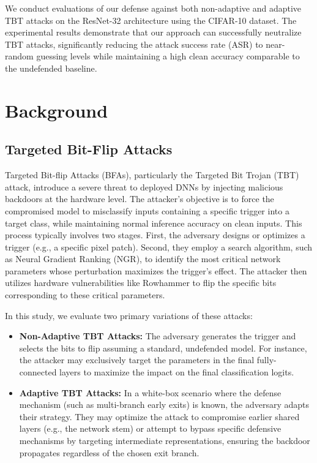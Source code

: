 \documentclass[conference]{IEEEtran}
\begin{document}
We conduct evaluations of our defense against both non-adaptive and adaptive TBT attacks on the ResNet-32 architecture using the CIFAR-10 dataset. The experimental results demonstrate that our approach can successfully neutralize TBT attacks, significantly reducing the attack success rate (ASR) to near-random guessing levels while maintaining a high clean accuracy comparable to the undefended baseline.

\section{Background}

\subsection{Targeted Bit-Flip Attacks}
Targeted Bit-flip Attacks (BFAs), particularly the Targeted Bit Trojan (TBT) attack, introduce a severe threat to deployed DNNs by injecting malicious backdoors at the hardware level. The attacker's objective is to force the compromised model to misclassify inputs containing a specific trigger into a target class, while maintaining normal inference accuracy on clean inputs. 
This process typically involves two stages. First, the adversary designs or optimizes a trigger (e.g., a specific pixel patch). Second, they employ a search algorithm, such as Neural Gradient Ranking (NGR), to identify the most critical network parameters whose perturbation maximizes the trigger's effect. The attacker then utilizes hardware vulnerabilities like Rowhammer to flip the specific bits corresponding to these critical parameters.

In this study, we evaluate two primary variations of these attacks:
\begin{itemize}
    \item \textbf{Non-Adaptive TBT Attacks:} The adversary generates the trigger and selects the bits to flip assuming a standard, undefended model. For instance, the attacker may exclusively target the parameters in the final fully-connected layers to maximize the impact on the final classification logits. 
    \item \textbf{Adaptive TBT Attacks:} In a white-box scenario where the defense mechanism (such as multi-branch early exits) is known, the adversary adapts their strategy. They may optimize the attack to compromise earlier shared layers (e.g., the network stem) or attempt to bypass specific defensive mechanisms by targeting intermediate representations, ensuring the backdoor propagates regardless of the chosen exit branch.
\end{itemize}
\end{document}
